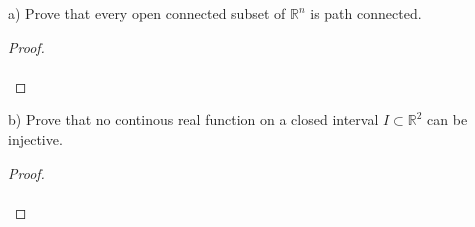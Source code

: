 a) Prove that every open connected subset of $\mathbb{R}^n$ is path connected.

\begin{proof}\renewcommand{\qedsymbol}{}\ \\\\
\end{proof}

\pagebreak


b) Prove that no continous real function on a closed interval $I \subset \mathbb{R}^2$ can be injective.

\begin{proof}\renewcommand{\qedsymbol}{}\ \\\\
\end{proof}
